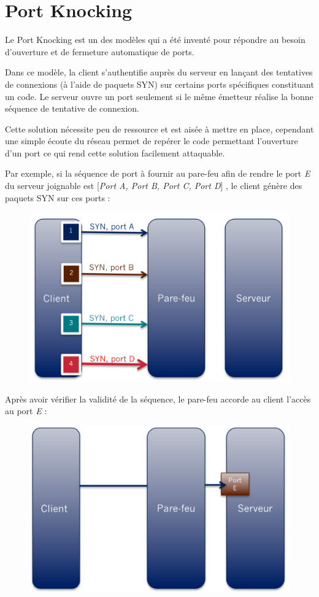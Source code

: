 \chapter{Port Knocking}

Le Port Knocking est un des modèles qui a été inventé pour répondre au besoin d'ouverture et de fermeture automatique de ports.

Dans ce modèle, la client s'authentifie auprès du serveur en lançant des tentatives de connexions (à l'aide de paquets SYN) sur certains ports spécifiques constituant un code. Le serveur ouvre un port seulement si le même émetteur réalise la bonne séquence de tentative de connexion.

Cette solution nécessite peu de ressource et est aisée à mettre en place, cependant une simple écoute du réseau permet de repérer le code permettant l'ouverture d'un port ce qui rend cette solution facilement attaquable.

Par exemple, si la séquence de port à fournir au pare-feu afin de rendre le port \emph{E} du serveur joignable est [\emph{Port A, Port B, Port C, Port D}] , le client génère des paquets SYN sur ces ports :
\begin{figure}[h]

\centerline{\includegraphics[scale=0.4]{portknocking1}}

\end{figure}

Après avoir vérifier la validité de la séquence, le pare-feu accorde au client l'accès au port \emph{E} : 

\begin{figure}[h]

\centerline{\includegraphics[scale=0.4]{portknocking2}}

\end{figure}